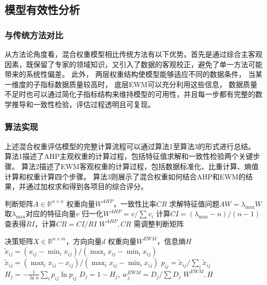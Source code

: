 \documentclass[twoside]{CUGThesis}
\begin{document}
\subsection{模型有效性分析}

\subsubsection{与传统方法对比}

从方法论角度看，混合权重模型相比传统方法有以下优势。首先是通过综合主客观因素，既保留了专家的领域知识，又引入了数据的客观校正，避免了单一方法可能带来的系统性偏差。
此外，
两层权重结构使模型能够适应不同的数据条件，
当某一维度的子指标数据质量较高时，
底层EWM可以充分利用这些信息，
数据质量不足时也可以通过简化子指标结构来维持模型的可用性，并且每一步都有完整的数学推导和一致性检验，评估过程透明且可复现。

\subsubsection{算法实现}

上述混合权重评估模型的完整计算流程可以通过算法1至算法3的形式进行总结。
算法1描述了AHP主观权重的计算过程，包括特征值求解和一致性检验两个关键步骤。
算法2描述了EWM客观权重的计算过程，包括数据标准化、比重计算、熵值计算和权重计算四个步骤。
算法3则展示了混合权重如何结合AHP和EWM的结果，并通过加权求和得到各项目的综合评分。

\begin{algorithm}[htbp]
\caption{AHP权重计算}
\label{alg:ahp}
\begin{algorithmic}[1]
\REQUIRE 判断矩阵$A \in \mathbb{R}^{n \times n}$
\ENSURE 权重向量$W^{AHP}$，一致性比率$CR$
\STATE 求解特征值问题$AW = \lambda_{\max}W$
\STATE 取$\lambda_{\max}$对应的特征向量$v$
\STATE 归一化$W^{AHP} = v / \sum v_i$
\STATE 计算$CI = (\lambda_{\max} - n)/(n-1)$
\STATE 查表得$RI$，计算$CR = CI/RI$
\RETURN $W^{AHP}, CR$
\ELSE
\RETURN 需调整判断矩阵
\ENDIF
\end{algorithmic}
\end{algorithm}

\begin{algorithm}[htbp]
\caption{EWM权重计算}
\label{alg:ewm}
\begin{algorithmic}[1]
\REQUIRE 决策矩阵$X \in \mathbb{R}^{n \times m}$，方向向量$d$
\ENSURE 权重向量$W^{EWM}$，信息熵$H$
\STATE $\tilde{x}_{ij} = (x_{ij} - \min_i x_{ij})/(\max_i x_{ij} - \min_i x_{ij})$
\ELSE
\STATE $\tilde{x}_{ij} = (\max_i x_{ij} - x_{ij})/(\max_i x_{ij} - \min_i x_{ij})$
\ENDIF
\STATE $p_{ij} = \tilde{x}_{ij} / \sum_i \tilde{x}_{ij}$
\STATE $H_j = -\frac{1}{\ln n}\sum_i p_{ij}\ln p_{ij}$
\ENDFOR
\STATE $D_j = 1 - H_j$, $w_j^{EWM} = D_j / \sum D_j$
\RETURN $W^{EWM}, H$
\end{algorithmic}
\end{algorithm}
\end{document}
